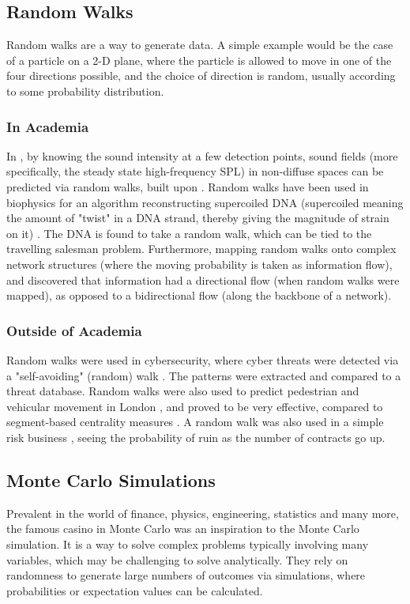 \documentclass[10pt, twocolumn]{article}
\begin{document}
\subsection{Random Walks} %
Random walks are a way to generate data. A simple example would be the case of a particle on a 2-D plane, where the particle is allowed to move in one of the four directions possible, and the choice of direction is random, usually according to some probability distribution.

\subsubsection{In Academia} %
In \cite{Kruzins1982}, by knowing the sound intensity at a few detection points, sound fields (more specifically, the steady state high-frequency SPL) in non-diffuse spaces can be predicted via random walks, built upon \cite{Gerlach1975}. Random walks have been used in biophysics for an algorithm reconstructing supercoiled DNA \cite{Baba2020} (supercoiled meaning the amount of "twist" in a DNA strand, thereby giving the magnitude of strain on it) \cite{Bauer1980}. The DNA is found to take a random walk, which can be tied to the travelling salesman problem. Furthermore, mapping random walks onto complex network structures (where the moving probability is taken as information flow), and \cite{Noh2004} discovered that information had a directional flow (when random walks were mapped), as opposed to a bidirectional flow (along the backbone of a network). 

\subsubsection{Outside of Academia} %
Random walks were used in cybersecurity, where cyber threats were detected via a "self-avoiding" (random) walk \cite{Nia2016}. The patterns were extracted and compared to a threat database. Random walks were also used to predict pedestrian and vehicular movement in London \cite{Hanna2021}, and proved to be very effective, compared to segment-based centrality measures \cite{Jayasinghe2015}. A random walk was also used in a simple risk business \cite{Seal1966}, seeing the probability of ruin as the number of contracts go up.

\subsection{Monte Carlo Simulations} %
Prevalent in the world of finance, physics, engineering, statistics and many more, the famous casino in Monte Carlo was an inspiration to the Monte Carlo simulation. It is a way to solve complex problems typically involving many variables, which may be challenging to solve analytically. They rely on randomness to generate large numbers of outcomes via simulations, where probabilities or expectation values can be calculated.
\end{document}
